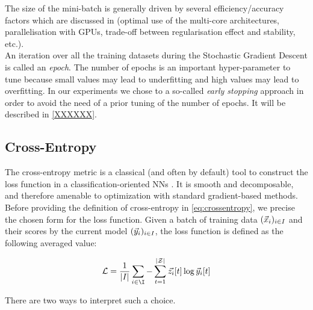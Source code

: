 The size of the mini-batch is generally
driven by several efficiency/accuracy factors which are \eg discussed in
\cite{GBC16} (\eg optimal use of the multi-core architectures, parallelisation
with GPUs, trade-off between regularisation effect and stability, etc.). \\

An iteration over all the training datasets during the Stochastic Gradient Descent is called an \emph{epoch}.
The number of epochs is an important hyper-parameter to tune because
small values may lead to underfitting and high values may lead to overfitting. In our experiments we chose to a so-called \emph{early stopping} approach in order to avoid the need of a prior tuning of the number of epochs. It will be described in \ref{XXXXXX}.\\

\subsection{Cross-Entropy}
The cross-entropy
metric is a classical (and often by default) tool to construct the loss function in a classification-oriented NNs \cite{LCH05,Goodfellow-et-al-2016}. It is smooth and
decomposable, and therefore amenable to optimization with standard
gradient-based methods. Before providing the definition of cross-entropy in \eqref{eq:crossentropy}, we precise the chosen form for the loss function. Given a batch of training data $(\vec{x}_i)_{i\in I}$ and their scores by the current model $(\vec{y}_i)_{i\in I}$, the loss function is defined as the following averaged value:

\begin{equation}\label{eq:lossfunction}
\mathcal{L} = \frac{1}{\lvert I \rvert} \sum_{i\in \I} -\sum_{t=1}^{|\sensVarSet|}\vec{\sensVar_i}[t]\log{\vNNOutput_i[t]}
\end{equation}   

There are two ways to interpret such a choice. 

